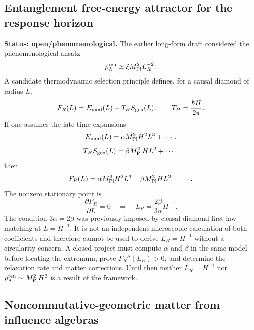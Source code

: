 \documentclass[11pt]{article}
\newcommand{\StatusOpen}{\textcolor{statusred}{\textsf{open/phenomenological}}}
\begin{document}
\subsection{Entanglement free-energy attractor for the response horizon}

\textbf{Status: \StatusOpen.}
The earlier long-form draft considered the phenomenological ansatz
\[
\rho_\Lambda^{\rm ren}\simeq \xi M_{\rm Pl}^2L_R^{-2}.
\]
A candidate thermodynamic selection principle defines, for a causal diamond
of radius \(L\),
\[
F_R(L)=E_{\rm mod}(L)-T_HS_{\rm gen}(L),
\qquad
T_H=\frac{\hbar H}{2\pi}.
\]
If one assumes the late-time expansions
\[
E_{\rm mod}(L)=\alpha M_{\rm Pl}^2H^2L^3+\cdots,
\]
\[
T_HS_{\rm gen}(L)=\beta M_{\rm Pl}^2HL^2+\cdots.
\]
then
\[
F_R(L)=\alpha M_{\rm Pl}^2H^2L^3-
\beta M_{\rm Pl}^2HL^2+\cdots.
\]
The nonzero stationary point is
\[
\frac{\partial F_R}{\partial L}=0
\quad\Longrightarrow\quad
L_R=\frac{2\beta}{3\alpha}H^{-1}.
\]
The condition \(3\alpha=2\beta\) was previously imposed by causal-diamond
first-law matching at \(L=H^{-1}\).  It is not an independent microscopic
calculation of both coefficients and therefore cannot be used to derive
\(L_R=H^{-1}\) without a circularity concern.  A closed project must compute
\(\alpha\) and \(\beta\) in the same model before locating the extremum, prove
\(F_R''(L_R)>0\), and determine the relaxation rate and matter corrections.
Until then neither \(L_R=H^{-1}\) nor
\(\rho_\Lambda^{\rm ren}\sim M_{\rm Pl}^2H^2\) is a result of the framework.

\subsection{Noncommutative-geometric matter from influence algebras}
\end{document}
